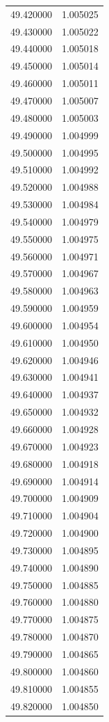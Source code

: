 \begin{tabular}{rr}
49.420000 & 1.005025 \\
49.430000 & 1.005022 \\
49.440000 & 1.005018 \\
49.450000 & 1.005014 \\
49.460000 & 1.005011 \\
49.470000 & 1.005007 \\
49.480000 & 1.005003 \\
49.490000 & 1.004999 \\
49.500000 & 1.004995 \\
49.510000 & 1.004992 \\
49.520000 & 1.004988 \\
49.530000 & 1.004984 \\
49.540000 & 1.004979 \\
49.550000 & 1.004975 \\
49.560000 & 1.004971 \\
49.570000 & 1.004967 \\
49.580000 & 1.004963 \\
49.590000 & 1.004959 \\
49.600000 & 1.004954 \\
49.610000 & 1.004950 \\
49.620000 & 1.004946 \\
49.630000 & 1.004941 \\
49.640000 & 1.004937 \\
49.650000 & 1.004932 \\
49.660000 & 1.004928 \\
49.670000 & 1.004923 \\
49.680000 & 1.004918 \\
49.690000 & 1.004914 \\
49.700000 & 1.004909 \\
49.710000 & 1.004904 \\
49.720000 & 1.004900 \\
49.730000 & 1.004895 \\
49.740000 & 1.004890 \\
49.750000 & 1.004885 \\
49.760000 & 1.004880 \\
49.770000 & 1.004875 \\
49.780000 & 1.004870 \\
49.790000 & 1.004865 \\
49.800000 & 1.004860 \\
49.810000 & 1.004855 \\
49.820000 & 1.004850 \\

\end{tabular}
